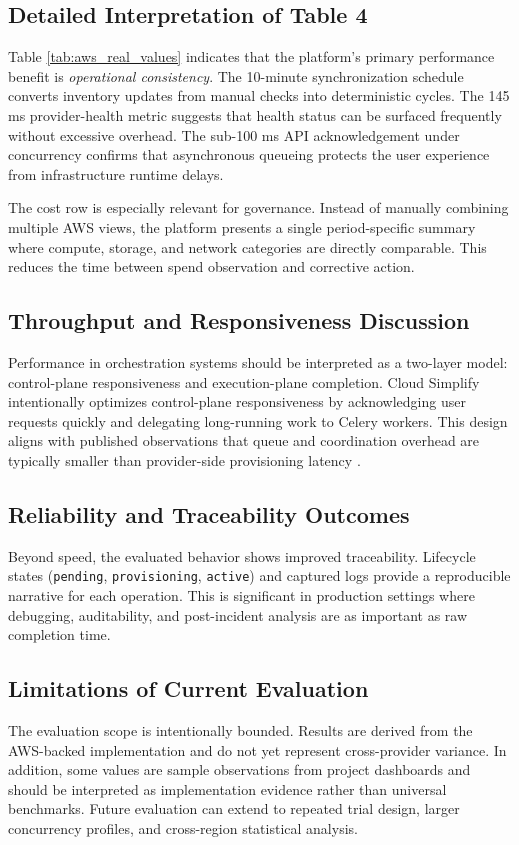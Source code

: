 \subsection{Detailed Interpretation of Table 4}
Table \ref{tab:aws_real_values} indicates that the platform's primary performance benefit is \textit{operational consistency}. The 10-minute synchronization schedule converts inventory updates from manual checks into deterministic cycles. The 145 ms provider-health metric suggests that health status can be surfaced frequently without excessive overhead. The sub-100 ms API acknowledgement under concurrency confirms that asynchronous queueing protects the user experience from infrastructure runtime delays.

The cost row is especially relevant for governance. Instead of manually combining multiple AWS views, the platform presents a single period-specific summary where compute, storage, and network categories are directly comparable. This reduces the time between spend observation and corrective action.

\subsection{Throughput and Responsiveness Discussion}
Performance in orchestration systems should be interpreted as a two-layer model: control-plane responsiveness and execution-plane completion. Cloud Simplify intentionally optimizes control-plane responsiveness by acknowledging user requests quickly and delegating long-running work to Celery workers. This design aligns with published observations that queue and coordination overhead are typically smaller than provider-side provisioning latency \cite{terraform_performance_2023, wjarr2024}.

\subsection{Reliability and Traceability Outcomes}
Beyond speed, the evaluated behavior shows improved traceability. Lifecycle states (\texttt{pending}, \texttt{provisioning}, \texttt{active}) and captured logs provide a reproducible narrative for each operation. This is significant in production settings where debugging, auditability, and post-incident analysis are as important as raw completion time.

\subsection{Limitations of Current Evaluation}
The evaluation scope is intentionally bounded. Results are derived from the AWS-backed implementation and do not yet represent cross-provider variance. In addition, some values are sample observations from project dashboards and should be interpreted as implementation evidence rather than universal benchmarks. Future evaluation can extend to repeated trial design, larger concurrency profiles, and cross-region statistical analysis.

